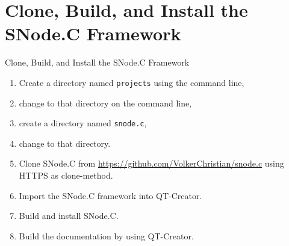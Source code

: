 \section{Clone, Build, and Install the SNode.C Framework}

\begin{frame}{Clone, Build, and Install the SNode.C Framework}
  \begin{enumerate}
    \item Create a directory named \lstinline|projects| using the command line,
    \item change to that directory on the command line,
    \item create a directory named \lstinline|snode.c|,
    \item change to that directory.
    \item Clone SNode.C from \textcolor{fh-ooe-red}{\href{https://github.com/VolkerChristian/snode.c}{https://github.com/VolkerChristian/snode.c}} using \textcolor{fh-ooe-red}{HTTPS} as clone-method.
    \item Import the SNode.C framework into QT-Creator.
    \item Build and install SNode.C.
    \item Build the documentation by using QT-Creator.
  \end{enumerate}
\end{frame}

